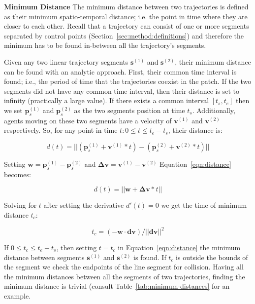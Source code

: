 \textbf{Minimum Distance} The minimum distance between two trajectories is defined as their minimum spatio-temporal distance; i.e. the point in time where they are closer to each other.
Recall that a trajectory can consist of one or more segments separated by control points (Section~\ref{sec:method:definitions}) and therefore the minimum has to be found in-between all the trajectory's segments.

Given any two linear trajectory segments $\mathbf{s}^{(1)}$ and $\mathbf{s}^{(2)}$, their minimum distance can be found with an analytic approach.
First, their common time interval is found; i.e., the period of time that the trajectories coexist in the patch.
If the two segments did not have any common time interval, then their distance is set to infinity (practically a large value).
If there exists a common interval $[t_{s}, t_{e}]$ then we set $\mathbf{p}_s^{(1)}$ and $\mathbf{p}_s^{(2)}$
as the two segments position at time $t_s$.
Additionally, agents moving on these two segments have a velocity of $\mathbf{v}^{(1)}$ and $\mathbf{v}^{(2)}$ respectively.
So, for any point in time $t: 0 \le t \le t_e - t_s$, their distance is:

\begin{equation}
	d(t) = || (\mathbf{p}_s^{(1)}+\mathbf{v}^{(1)} * t) -
				(\mathbf{p}_s^{(2)}+\mathbf{v}^{(2)} * t) ||
	\label{eqn:distance}
\end{equation}

Setting $ \mathbf{w} = \mathbf{p}_s^{(1)} - \mathbf{p}_s^{(2)}$ and $\mathbf{\Delta{v}} = \mathbf{v}^{(1)} - \mathbf{v}^{(2)}$ Equation~\ref{eqn:distance} becomes:

\begin{equation}
	d(t) = || \mathbf{w} + \mathbf{\Delta{v}}*t ||
	\label{eqn:distance_simple}
\end{equation}

Solving for $t$ after setting the derivative $d'(t) = 0$ we get the time of minimum distance $t_c$:

\begin{equation}
	t_c = (-\mathbf{w} \cdot \mathbf{dv}) / || \mathbf{dv} || ^ 2
	\label{eqn:distance_time}
\end{equation}

If $0 \le t_c \le t_e - t_s$, then setting $t = t_c$ in Equation~\ref{eqn:distance} the minimum distance between segments $\mathbf{s}^{(1)}$ and $\mathbf{s}^{(2)}$ is found.
If $t_c$ is outside the bounds of the segment we check the endpoints of the line segment for collision.
Having all the minimum distances between all the segments of two trajectories, finding the minimum distance is trivial (consult Table~\ref{tab:minimum-distances} for an example.

